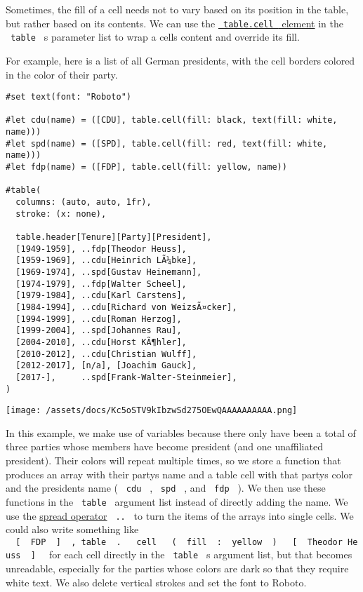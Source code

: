 Sometimes, the fill of a cell needs not to vary based on its position in
the table, but rather based on its contents. We can use the
\href{/docs/reference/model/table/\#definitions-cell}{\texttt{\ table.cell\ }
element} in the \texttt{\ table\ } \textquotesingle s parameter list to
wrap a cell\textquotesingle s content and override its fill.

For example, here is a list of all German presidents, with the cell
borders colored in the color of their party.

\begin{verbatim}
#set text(font: "Roboto")

#let cdu(name) = ([CDU], table.cell(fill: black, text(fill: white, name)))
#let spd(name) = ([SPD], table.cell(fill: red, text(fill: white, name)))
#let fdp(name) = ([FDP], table.cell(fill: yellow, name))

#table(
  columns: (auto, auto, 1fr),
  stroke: (x: none),

  table.header[Tenure][Party][President],
  [1949-1959], ..fdp[Theodor Heuss],
  [1959-1969], ..cdu[Heinrich LÃ¼bke],
  [1969-1974], ..spd[Gustav Heinemann],
  [1974-1979], ..fdp[Walter Scheel],
  [1979-1984], ..cdu[Karl Carstens],
  [1984-1994], ..cdu[Richard von WeizsÃ¤cker],
  [1994-1999], ..cdu[Roman Herzog],
  [1999-2004], ..spd[Johannes Rau],
  [2004-2010], ..cdu[Horst KÃ¶hler],
  [2010-2012], ..cdu[Christian Wulff],
  [2012-2017], [n/a], [Joachim Gauck],
  [2017-],     ..spd[Frank-Walter-Steinmeier],
)
\end{verbatim}

\texttt{[image: /assets/docs/Kc5oSTV9kIbzwSd275OEwQAAAAAAAAAA.png]}

In this example, we make use of variables because there only have been a
total of three parties whose members have become president (and one
unaffiliated president). Their colors will repeat multiple times, so we
store a function that produces an array with their
party\textquotesingle s name and a table cell with that
party\textquotesingle s color and the president\textquotesingle s name (
\texttt{\ cdu\ } , \texttt{\ spd\ } , and \texttt{\ fdp\ } ). We then
use these functions in the \texttt{\ table\ } argument list instead of
directly adding the name. We use the
\href{/docs/reference/foundations/arguments/\#spreading}{spread
operator} \texttt{\ ..\ } to turn the items of the arrays into single
cells. We could also write something like
\texttt{\ }{\texttt{\ {[}\ }}\texttt{\ FDP\ }{\texttt{\ {]}\ }}\texttt{\ ,\ table\ }{\texttt{\ .\ }}\texttt{\ }{\texttt{\ cell\ }}\texttt{\ }{\texttt{\ (\ }}\texttt{\ fill\ }{\texttt{\ :\ }}\texttt{\ yellow\ }{\texttt{\ )\ }}\texttt{\ }{\texttt{\ {[}\ }}\texttt{\ Theodor\ Heuss\ }{\texttt{\ {]}\ }}\texttt{\ }
for each cell directly in the \texttt{\ table\ } \textquotesingle s
argument list, but that becomes unreadable, especially for the parties
whose colors are dark so that they require white text. We also delete
vertical strokes and set the font to Roboto.

